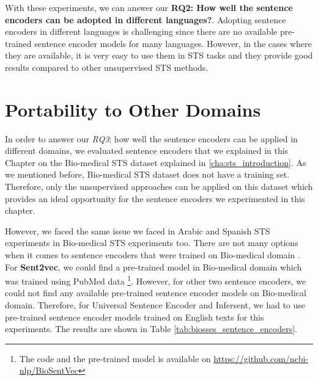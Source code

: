 With these experiments, we can answer our \textbf{RQ2: How well the sentence encoders can be adopted in different languages?}. Adopting sentence encoders in different languages is challenging since there are no available pre-trained sentence encoder models for many languages. However, in the cases where they are available, it is very easy to use them in STS tasks and they provide good results compared to other unsupervised STS methods. 


\section{Portability to Other Domains}
\label{sec:sentence_domains}

In order to answer our \textit{RQ3}; how well the sentence encoders can be applied in different domains, we evaluated sentence encoders that we explained in this Chapter on the Bio-medical STS dataset explained in \ref{cha:sts_introduction}. As we mentioned before, Bio-medical STS dataset does not have a training set. Therefore, only the unsupervised approaches can be applied on this dataset which provides an ideal opportunity for the sentence encoders we experimented in this chapter. 

However, we faced the same issue we faced in Arabic and Spanish STS experiments in Bio-medical STS experiments too. There are not many options when it comes to sentence encoders that were trained on Bio-medical domain \cite{TAWFIK2020103396}. For \textbf{Sent2vec}, we could find a pre-trained model in Bio-medical domain which was trained using PubMed data \cite{8904728}\footnote{The code and the pre-trained model is available on \url{https://github.com/ncbi-nlp/BioSentVec}}. However, for other two sentence encoders, we could not find any available pre-trained sentence encoder models on Bio-medical domain. Therefore, for Universal Sentence Encoder and Infersent, we had to use pre-trained sentence encoder models trained on English texts for this experiments. The results are shown in Table \ref{tab:biosses_sentence_encoders}.

